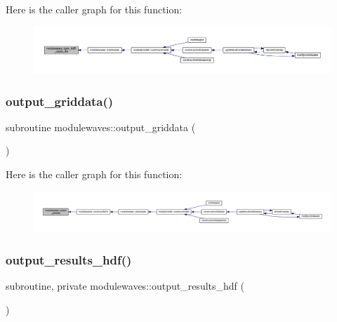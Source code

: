 Here is the caller graph for this function\+:\nopagebreak
\begin{figure}[H]
\begin{center}
\leavevmode
\includegraphics[width=350pt]{namespacemodulewaves_ad471c985c50cab76ec8f36df2211dc37_icgraph}
\end{center}
\end{figure}
\mbox{\label{namespacemodulewaves_a566d06de3bff651d00d4a28e0e06157b}} 
\subsubsection{\texorpdfstring{output\+\_\+griddata()}{output\_griddata()}}
{\footnotesize\ttfamily subroutine modulewaves\+::output\+\_\+griddata (\begin{DoxyParamCaption}{ }\end{DoxyParamCaption})\hspace{0.3cm}{\ttfamily [private]}}

Here is the caller graph for this function\+:\nopagebreak
\begin{figure}[H]
\begin{center}
\leavevmode
\includegraphics[width=350pt]{namespacemodulewaves_a566d06de3bff651d00d4a28e0e06157b_icgraph}
\end{center}
\end{figure}
\mbox{\label{namespacemodulewaves_a89f925f57b1b3b8af0ce6bb51398f224}} 
\subsubsection{\texorpdfstring{output\+\_\+results\+\_\+hdf()}{output\_results\_hdf()}}
{\footnotesize\ttfamily subroutine, private modulewaves\+::output\+\_\+results\+\_\+hdf (\begin{DoxyParamCaption}{ }\end{DoxyParamCaption})\hspace{0.3cm}{\ttfamily [private]}}

